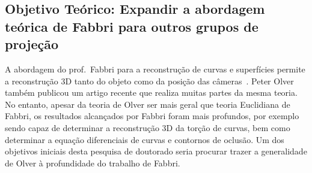 \documentclass[a4paper,titlepage]{article}
\begin{document}
\subsection{Objetivo Teórico: Expandir a abordagem teórica de Fabbri para outros
grupos de projeção}

A abordagem do prof.\ Fabbri para a reconstrução de curvas e superfícies permite
a reconstrução 3D tanto do objeto como da posição das
câmeras~\cite{fabbri2016multiview}. Peter Olver também publicou um
artigo recente que realiza muitas partes da mesma teoria. No entanto, apesar da
teoria de Olver ser mais geral que teoria Euclidiana de Fabbri, os resultados
alcançados por Fabbri foram mais profundos, por exemplo sendo capaz de
determinar a reconstrução 3D da torção de curvas, bem como determinar a equação
diferenciais de curvas e contornos de oclusão. Um dos objetivos iniciais desta
pesquisa de doutorado seria procurar trazer a generalidade de Olver à
profundidade do trabalho de Fabbri.
\end{document}
